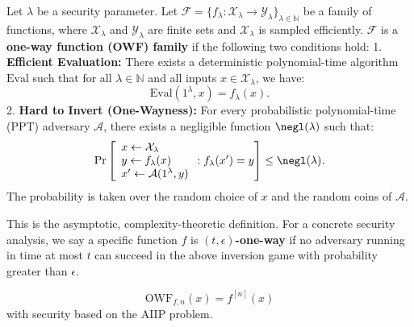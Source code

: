 \begin{definition}\label{def:owf}
            Let $\lambda$ be a security parameter. Let $\mathcal{F} = \{f_{\lambda}: \mathcal{X}_{\lambda} \to \mathcal{Y}_{\lambda}\}_{\lambda \in \mathbb{N}}$ be a family of functions, where $\mathcal{X}_{\lambda}$ and $\mathcal{Y}_{\lambda}$ are finite sets and $\mathcal{X}_{\lambda}$ is sampled efficiently.
            $\mathcal{F}$ is a \textbf{one-way function (OWF) family} if the following two conditions hold:
            1.  \textbf{Efficient Evaluation:} There exists a deterministic polynomial-time algorithm $\mathrm{Eval}$ such that for all $\lambda \in \mathbb{N}$ and all inputs $x \in \mathcal{X}_{\lambda}$, we have:
                $$\mathrm{Eval}(1^{\lambda}, x) = f_{\lambda}(x).$$
            2.  \textbf{Hard to Invert (One-Wayness):} For every probabilistic polynomial-time (PPT) adversary $\mathcal{A}$, there exists a negligible function $\negl(\lambda)$ such that:
                \begin{equation}
                    \Pr\left[
                    \begin{array}{l}
                        x \gets \mathcal{X}_{\lambda} \\
                        y \gets f_{\lambda}(x) \\
                        x' \gets \mathcal{A}(1^{\lambda}, y)
                    \end{array}
                    : f_{\lambda}(x') = y
                    \right] \leq \negl(\lambda).
                \end{equation}
                The probability is taken over the random choice of $x$ and the random coins of $\mathcal{A}$.
            \end{definition}
            \begin{remark}
            This is the asymptotic, complexity-theoretic definition. For a concrete security analysis, we say a specific function $f$ is \textbf{$(t, \epsilon)$-one-way} if no adversary running in time at most $t$ can succeed in the above inversion game with probability greater than $\epsilon$.
            \end{remark}
        \begin{equation}
            \text{OWF}_{f,n}(x) = f^{[n]}(x)
        \end{equation}
        with security based on the AIIP problem.